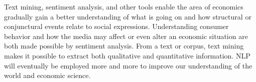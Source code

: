 Text mining, sentiment analysis, and other tools enable the area of economics gradually gain a better understanding of what is going on and how structural or conjunctural events relate to social expressions. Understanding consumer behavior and how the media may affect or even alter an economic situation are both made possible by sentiment analysis. From a text or corpus, text mining makes it possible to extract both qualitative and quantitative information. NLP will eventually be employed more and more to improve our understanding of the world and economic science.\\
